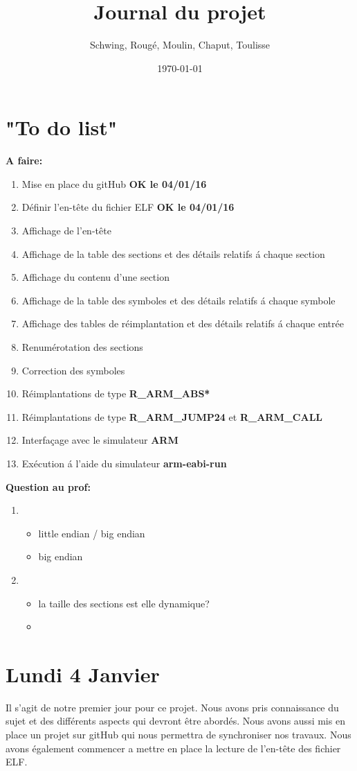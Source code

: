 \documentclass[12pt, a4paper]{article}
\title{Journal du projet}
\author{Schwing, Roug\'e, Moulin, Chaput, Toulisse}
\date{\today}
\begin{document}
\maketitle

\section{"To do list"}
\textbf{A faire:}
\begin{enumerate}
\item Mise en place du gitHub \textbf{OK le 04/01/16} 
\item Définir l'en-t\^ete du fichier ELF \textbf{OK le 04/01/16}
\item Affichage de l'en-t\^ete
\item Affichage de la table des sections et des détails 
	relatifs \'a chaque section
\item Affichage du contenu d'une section
\item Affichage de la table des symboles et des détails relatifs 
	\'a chaque symbole
\item Affichage des tables de réimplantation et des détails relatifs 
	\'a chaque entrée 
\item Renumérotation des sections
\item Correction des symboles
\item Réimplantations de type \textbf{R\_ARM\_ABS*}
\item Réimplantations de type \textbf{R\_ARM\_JUMP24} et 
	\textbf{R\_ARM\_CALL}
\item Interfaçage avec le simulateur \textbf{ARM}
\item Exécution \'a l'aide du simulateur \textbf{arm-eabi-run}
\end{enumerate}

\textbf{Question au prof:}
\begin{enumerate}
\item 
	\begin{itemize}
		\item little endian / big endian
		\item big endian
	\end{itemize}
\item 
	\begin{itemize}
		\item la taille des sections est elle dynamique?
		\item 
	\end{itemize}
\end{enumerate}

\section{Lundi 4 Janvier}

Il s'agit de notre premier jour pour ce projet. Nous avons pris 
connaissance du sujet et des différents aspects qui devront être 
abordés. Nous avons aussi mis en place un projet sur gitHub qui nous 
permettra de synchroniser nos travaux. Nous avons également 
commencer a mettre en place la lecture de l'en-t\^ete des fichier 
ELF.
\end{document}
